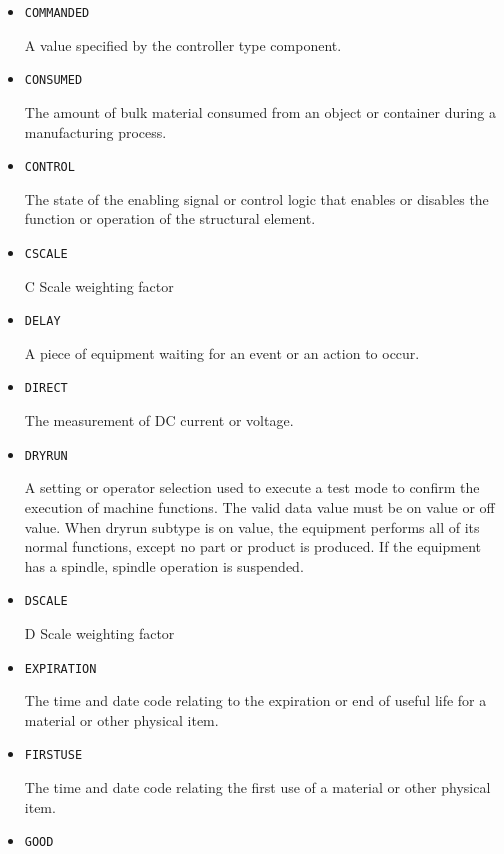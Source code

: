 \begin{itemize}
\item \texttt{COMMANDED}  

A value specified by the controller type component.


\item \texttt{CONSUMED}  

The amount of bulk material consumed from an object or container during a manufacturing process.


\item \texttt{CONTROL}  

The state of the enabling signal or control logic that enables or disables the function or operation of the structural element.


\item \texttt{C\textunderscore SCALE}  

C Scale weighting factor


\item \texttt{DELAY}  

A piece of equipment waiting for an event or an action to occur.


\item \texttt{DIRECT}  

The measurement of DC current or voltage.


\item \texttt{DRY\textunderscore RUN}  

A setting or operator selection used to execute a test mode to confirm the execution of machine functions. 
 The valid data value must be on value or off value. 
 When dryrun subtype is on value, the equipment performs all of its normal functions, except no part or product is produced.  If the equipment has a spindle, spindle operation is suspended.


\item \texttt{D\textunderscore SCALE}  

D Scale weighting factor


\item \texttt{EXPIRATION}  

The time and date code relating to the expiration or end of useful life for a material or other physical item.


\item \texttt{FIRST\textunderscore USE}  

The time and date code relating the first use of a material or other physical item.


\item \texttt{GOOD}  


\end{itemize}

